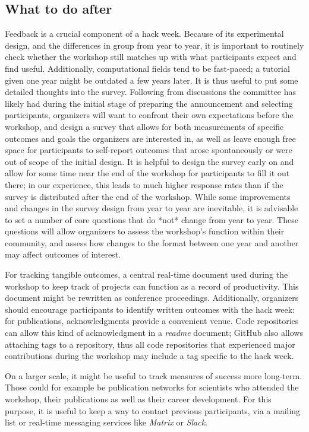 \subsection{What to do after}

Feedback is a crucial component of a hack week. Because of its experimental design, and the differences in group from year to year, it is important to routinely check whether the workshop still matches up with what participants expect and find useful. Additionally, computational fields tend to be fast-paced; a tutorial given one year might be outdated a few years later. It is thus useful to put some detailed thoughts into the survey. Following from discussions the committee has likely had during the initial stage of preparing the announcement and selecting participants, organizers will want to confront their own expectations before the workshop, and design a survey that allows for both measurements of specific outcomes and goals the organizers are interested in, as well as leave enough free space for participants to self-report outcomes that arose spontaneously or were out of scope of the initial design. It is helpful to design the survey early on and allow for some time near the end of the workshop for participants to fill it out there; in our experience, this leads to much higher response rates than if the survey is distributed after the end of the workshop. While some improvements and changes in the survey design from year to year are inevitable, it is advisable to set a number of core questions that do *not* change from year to year. These questions will allow organizers to assess the workshop's function within their community, and assess how changes to the format between one year and another may affect outcomes of interest.

For tracking tangible outcomes, a central real-time document used during the workshop to keep track of projects can function as a record of productivity. This document might be rewritten as conference proceedings. Additionally, organizers should encourage participants to identify written outcomes with the hack week: for publications, acknowledgments provide a convenient venue. Code repositories can allow this kind of acknowledgment in a \textit{readme} document; GitHub also allows attaching tags to a repository, thus all code repositories that experienced major contributions during the workshop may include a tag specific to the hack week.

On a larger scale, it might be useful to track measures of success more long-term. Those could for example be publication networks for scientists who attended the workshop, their publications as well as their career development. For this purpose, it is useful to keep a way to contact previous participants, via a mailing list or real-time messaging services like \textit{Matrix} or \textit{Slack}.
